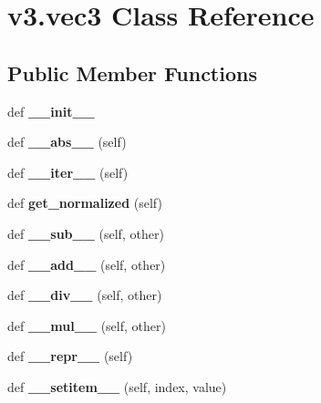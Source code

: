 \hypertarget{classv3_1_1vec3}{}\section{v3.\+vec3 Class Reference}
\label{classv3_1_1vec3}
\subsection*{Public Member Functions}
\begin{DoxyCompactItemize}
\item 
\hypertarget{classv3_1_1vec3_a6b71dd959cfe38cdfc1e97fb170e1e64}{}def {\bfseries \+\_\+\+\_\+init\+\_\+\+\_\+}\label{classv3_1_1vec3_a6b71dd959cfe38cdfc1e97fb170e1e64}

\item 
\hypertarget{classv3_1_1vec3_a9d57a93db63fa0541a4701e7a23069ef}{}def {\bfseries \+\_\+\+\_\+abs\+\_\+\+\_\+} (self)\label{classv3_1_1vec3_a9d57a93db63fa0541a4701e7a23069ef}

\item 
\hypertarget{classv3_1_1vec3_a74328d6c6bc5158e0eb047c71360147a}{}def {\bfseries \+\_\+\+\_\+iter\+\_\+\+\_\+} (self)\label{classv3_1_1vec3_a74328d6c6bc5158e0eb047c71360147a}

\item 
\hypertarget{classv3_1_1vec3_a8fd8168bd72eaa605539a2d6a46ab8d8}{}def {\bfseries get\+\_\+normalized} (self)\label{classv3_1_1vec3_a8fd8168bd72eaa605539a2d6a46ab8d8}

\item 
\hypertarget{classv3_1_1vec3_a9c631bf20da30777f24ec3012fc1c54e}{}def {\bfseries \+\_\+\+\_\+sub\+\_\+\+\_\+} (self, other)\label{classv3_1_1vec3_a9c631bf20da30777f24ec3012fc1c54e}

\item 
\hypertarget{classv3_1_1vec3_a747b885a97da891d8da838dd4ee121fe}{}def {\bfseries \+\_\+\+\_\+add\+\_\+\+\_\+} (self, other)\label{classv3_1_1vec3_a747b885a97da891d8da838dd4ee121fe}

\item 
\hypertarget{classv3_1_1vec3_a32ef2c056e8b4da011bf45ad0bad1293}{}def {\bfseries \+\_\+\+\_\+div\+\_\+\+\_\+} (self, other)\label{classv3_1_1vec3_a32ef2c056e8b4da011bf45ad0bad1293}

\item 
\hypertarget{classv3_1_1vec3_ae3c44b93d824783efdf4fbe6a86ef268}{}def {\bfseries \+\_\+\+\_\+mul\+\_\+\+\_\+} (self, other)\label{classv3_1_1vec3_ae3c44b93d824783efdf4fbe6a86ef268}

\item 
\hypertarget{classv3_1_1vec3_a9d7d44a7c1606c868c9dbcaf33ce5ffa}{}def {\bfseries \+\_\+\+\_\+repr\+\_\+\+\_\+} (self)\label{classv3_1_1vec3_a9d7d44a7c1606c868c9dbcaf33ce5ffa}

\item 
\hypertarget{classv3_1_1vec3_ac3bab8cc971bb073dcef29c4b93cb8a3}{}def {\bfseries \+\_\+\+\_\+setitem\+\_\+\+\_\+} (self, index, value)\label{classv3_1_1vec3_ac3bab8cc971bb073dcef29c4b93cb8a3}

\end{DoxyCompactItemize}
